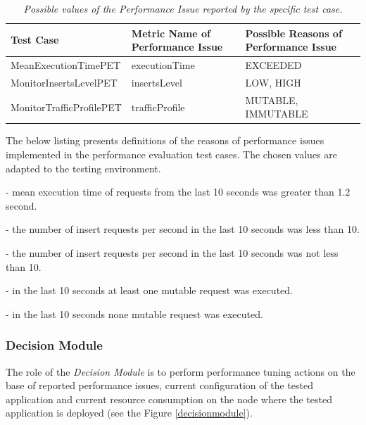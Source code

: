 \documentclass[12pt,a4paper]{article}
\let\tempone\itemize
\let\temptwo\enditemize
\renewenvironment{itemize}{\tempone\addtolength{\itemsep}{-0.4\baselineskip}}{\temptwo}
\begin{document}
\begin{table}[!htb]
\begin{center}
\begin{tabularx}{\textwidth}{l|p{4cm}|X}
\textbf{Test Case} & \textbf{Metric Name of Performance Issue} & \textbf{Possible Reasons of Performance Issue} \\ \hline
MeanExecutionTimePET & executionTime & EXCEEDED \\\hline
MonitorInsertsLevelPET & insertsLevel &LOW, HIGH \\\hline
MonitorTrafficProfilePET & trafficProfile & MUTABLE, IMMUTABLE \\
\end{tabularx}
\end{center}
\caption{\textit{Possible values of the Performance Issue reported by the specific test case.}}\label{testcasescomp}
\end{table}

The below listing presents definitions of the reasons of performance issues implemented in the performance evaluation test cases. The chosen values are adapted to the testing environment. 
\begin{itemize}
\item[EXCEEDED (executionTime)] - mean execution time of requests from the last 10 seconds was greater than 1.2 second. 
\item[LOW (insertsLevel)] - the number of insert requests per second in the last 10 seconds was  less than 10. 
\item[HIGH (insertsLevel)] - the number of insert requests per second in the last 10 seconds was not less than 10.
\item[MUTABLE (trafficProfile)] - in the last 10 seconds at least one mutable request was executed.
\item[IMMUTABLE (trafficProfile)] - in the last 10 seconds none mutable request was executed.
\end{itemize}

\subsubsection{Decision Module} \label{dm}

The role of the \textit{Decision Module} is to perform performance tuning actions on the base of reported performance issues, current configuration of the tested application and current resource consumption on the node where the tested application is deployed (see the Figure \ref{decisionmodule}). 
\end{document}
